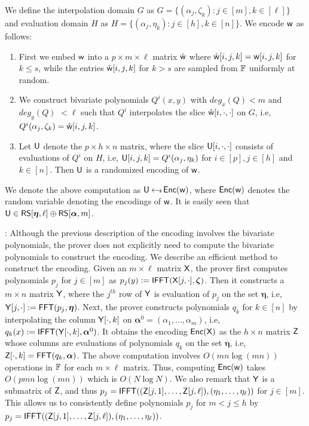 We define the interpolation domain $G$ as $G=\{(\alpha_j,\zeta_k): j\in[m],
k\in [\ell]\}$ and evaluation domain $H$ as $H=\{(\alpha_j,\eta_k): j\in [h],
k\in [n]\}$. We encode $\mathsf{w}$ as follows:
\begin{enumerate}[{\rm (i)}]
\item First we embed $\mathsf{w}$ into a $p\times m\times \ell$ matrix $\hat{\mathsf{w}}$
where $\hat{\mathsf{w}}[i,j,k]=\mathsf{w}[i,j,k]$ for $k\leq s$, while the entries
$\hat{\mathsf{w}}[i,j,k]$ for $k>s$ are sampled from $\mathbb{F}$ uniformly at random.
\item We construct bivariate polynomials $Q^i(x,y)$ with $deg_x(Q)<m$ and
$deg_y(Q) $ $<\ell$ such that $Q^i$ interpolates the slice
$\hat{\mathsf{w}}[i,\cdot,\cdot]$ on $G$, i.e,
$Q^i(\alpha_j,\zeta_k)=\hat{\mathsf{w}}[i,j,k]$. 
\item Let $\mathsf{U}$ denote the $p\times h\times n$ matrix, where the slice
$\mathsf{U}[i,\cdot,\cdot]$ consists of evaluations of $Q^i$ on $H$, i.e,
$\mathsf{U}[i,j,k]=Q^i(\alpha_j,\eta_k)$ for $i\in [p], j\in [h]$ and $k\in [n]$.
Then $\mathsf{U}$ is a randomized encoding of $\mathsf{w}$.
\end{enumerate}
We denote the above computation as $\mathsf{U}\hskip2.3pt{\gets\!\!\mbox{\tiny${\$}$\normalsize}}\, \mathsf{Enc}(\mathsf{w})$, where $\mathsf{Enc}(\mathsf{w})$
denotes the random variable denoting the encodings of $\mathsf{w}$. It is easily seen
that $\mathsf{U}\in \mathsf{RS}[\bm{\eta},\ell]\oplus \mathsf{RS}[\bm{\alpha},m]$.\smallskip

: Although the previous
description of the encoding involves the bivariate polynomials, 
the prover does not explicitly need to compute the bivariate polynomials to
construct the encoding. We describe an efficient method to construct the
encoding. Given an $m\times \ell$
matrix $\mathsf{X}$, the prover first computes polynomials $p_j$ for $j\in
[m]$ as $p_j(y) := \mathsf{IFFT}(\mathsf{X}[j,\cdot], \bm{\zeta})$. Then it constructs a $m\times n$
matrix $\mathsf{Y}$, where the $j^{th}$ row of $\mathsf{Y}$ is evaluation of $p_j$ on the set
$\bm{\eta}$, i.e, $\mathsf{Y}[j,\cdot] := \mathsf{FFT}(p_j, \bm{\eta})$. Next, the prover constructs
polynomials $q_k$ for $k\in [n]$ by interpolating the column $\mathsf{Y}[\cdot,k]$ on
$\bm{\alpha}^0 = (\alpha_1,\ldots,\alpha_m)$, i.e, $q_k(x) := \mathsf{IFFT}(\mathsf{Y}[\cdot,k],
\bm{\alpha}^0)$. It obtains the encoding $\mathsf{Enc}(\mathsf{X})$ as the $h\times n$ matrix
$\mathsf{Z}$ whose columns are evaluations of polynomials $q_k$ on the set $\bm{\eta}$, i.e,
$\mathsf{Z}[\cdot,k]=\mathsf{FFT}(q_k,\bm{\alpha})$. The above computation involves
$O(mn\log(mn))$ operations in $\mathbb{F}$ for each $m\times \ell$ matrix. Thus, computing $\mathsf{Enc}(\mathsf{w})$ takes
$O(pmn\log(mn))$ which is $O(N\log{N})$. We also remark that $\mathsf{Y}$ is a submatrix
of $\mathsf{Z}$, and thus
$p_j=\mathsf{IFFT}((\mathsf{Z}[j,1],\ldots,\mathsf{Z}[j,\ell]),(\eta_1,\ldots,\eta_{\ell}))$ for $j\in
[m]$. This allows us to consistently define polynomials $p_j$ for $m<j\leq h$ by
$p_j=\mathsf{IFFT}((\mathsf{Z}[j,1],\ldots,\mathsf{Z}[j,\ell]),(\eta_1,\ldots,\eta_{\ell}))$.

